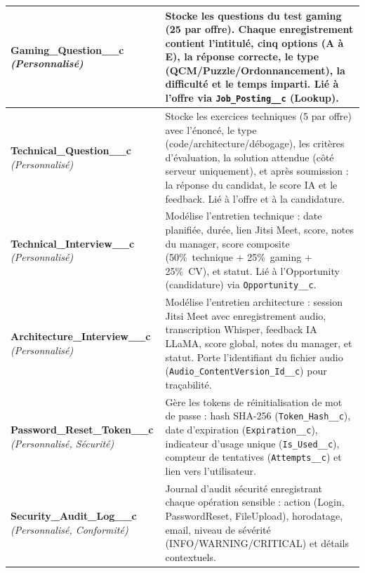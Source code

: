 \begin{longtable}{|p{4.2cm}|p{10.8cm}|}
\textbf{Gaming\_Question\_\_c} \newline\textit{(Personnalisé)} & Stocke les questions du test gaming (25 par offre). Chaque enregistrement contient l'intitulé, cinq options (A à E), la réponse correcte, le type (QCM/Puzzle/Ordonnancement), la difficulté et le temps imparti. Lié à l'offre via \texttt{Job\_Posting\_\_c} (Lookup). \\
\hline

\textbf{Technical\_Question\_\_c} \newline\textit{(Personnalisé)} & Stocke les exercices techniques (5 par offre) avec l'énoncé, le type (code/architecture/débogage), les critères d'évaluation, la solution attendue (côté serveur uniquement), et après soumission : la réponse du candidat, le score IA et le feedback. Lié à l'offre et à la candidature. \\
\hline

\textbf{Technical\_Interview\_\_c} \newline\textit{(Personnalisé)} & Modélise l'entretien technique : date planifiée, durée, lien Jitsi Meet, score, notes du manager, score composite (50\%~technique + 25\%~gaming + 25\%~CV), et statut. Lié à l'Opportunity (candidature) via \texttt{Opportunity\_\_c}. \\
\hline

\textbf{Architecture\_Interview\_\_c} \newline\textit{(Personnalisé)} & Modélise l'entretien architecture : session Jitsi Meet avec enregistrement audio, transcription Whisper, feedback IA LLaMA, score global, notes du manager, et statut. Porte l'identifiant du fichier audio (\texttt{Audio\_ContentVersion\_Id\_\_c}) pour traçabilité. \\
\hline

\textbf{Password\_Reset\_Token\_\_c} \newline\textit{(Personnalisé, Sécurité)} & Gère les tokens de réinitialisation de mot de passe : hash SHA-256 (\texttt{Token\_Hash\_\_c}), date d'expiration (\texttt{Expiration\_\_c}), indicateur d'usage unique (\texttt{Is\_Used\_\_c}), compteur de tentatives (\texttt{Attempts\_\_c}) et lien vers l'utilisateur. \\
\hline

\textbf{Security\_Audit\_Log\_\_c} \newline\textit{(Personnalisé, Conformité)} & Journal d'audit sécurité enregistrant chaque opération sensible : action (Login, PasswordReset, FileUpload), horodatage, email, niveau de sévérité (INFO/WARNING/CRITICAL) et détails contextuels. \\
\hline


\end{longtable}
